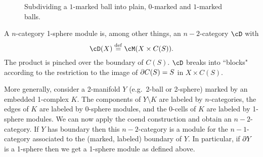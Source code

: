 \begin{figure}[t] \centering
{}
\caption{Subdividing a $1$-marked ball into plain, $0$-marked and $1$-marked balls.}
\label{subdividing1marked}
\end{figure}

A $n$-category 1-sphere module is, among other things, an $n{-}2$-category $\cD$ with
\[
	\cD(X) \deq \cM(X\times C(S)) .
\]
The product is pinched over the boundary of $C(S)$.
$\cD$ breaks into ``blocks" according to the restriction to the 
image of $\partial C(S) = S$ in $X\times C(S)$.

More generally, consider a 2-manifold $Y$ 
(e.g.\ 2-ball or 2-sphere) marked by an embedded 1-complex $K$.
The components of $Y\setminus K$ are labeled by $n$-categories, 
the edges of $K$ are labeled by 0-sphere modules, 
and the 0-cells of $K$ are labeled by 1-sphere modules.
We can now apply the coend construction and obtain an $n{-}2$-category.
If $Y$ has boundary then this $n{-}2$-category is a module for the $n{-}1$-category
associated to the (marked, labeled) boundary of $Y$.
In particular, if $\partial Y$ is a 1-sphere then we get a 1-sphere module as defined above.


